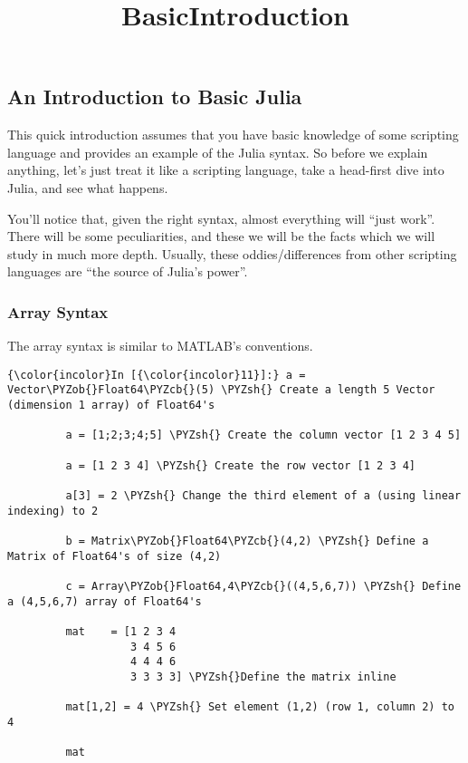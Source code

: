 \documentclass[11pt]{article}
\title{BasicIntroduction}
\def\PYZob{\char`\{}
\def\PYZcb{\char`\}}
\def\PYZsh{\char`\#}
\begin{document}
    
    
    \maketitle
    
    

    
    \subsection{An Introduction to Basic
Julia}\label{an-introduction-to-basic-julia}

This quick introduction assumes that you have basic knowledge of some
scripting language and provides an example of the Julia syntax. So
before we explain anything, let's just treat it like a scripting
language, take a head-first dive into Julia, and see what happens.

You'll notice that, given the right syntax, almost everything will
``just work''. There will be some peculiarities, and these we will be
the facts which we will study in much more depth. Usually, these
oddies/differences from other scripting languages are ``the source of
Julia's power''.

    \subsubsection{Array Syntax}\label{array-syntax}

The array syntax is similar to MATLAB's conventions.

    \begin{Verbatim}[commandchars=\\\{\}]
{\color{incolor}In [{\color{incolor}11}]:} a = Vector\PYZob{}Float64\PYZcb{}(5) \PYZsh{} Create a length 5 Vector (dimension 1 array) of Float64's
         
         a = [1;2;3;4;5] \PYZsh{} Create the column vector [1 2 3 4 5]
         
         a = [1 2 3 4] \PYZsh{} Create the row vector [1 2 3 4]
         
         a[3] = 2 \PYZsh{} Change the third element of a (using linear indexing) to 2
         
         b = Matrix\PYZob{}Float64\PYZcb{}(4,2) \PYZsh{} Define a Matrix of Float64's of size (4,2)
         
         c = Array\PYZob{}Float64,4\PYZcb{}((4,5,6,7)) \PYZsh{} Define a (4,5,6,7) array of Float64's 
         
         mat    = [1 2 3 4
                   3 4 5 6
                   4 4 4 6
                   3 3 3 3] \PYZsh{}Define the matrix inline 
         
         mat[1,2] = 4 \PYZsh{} Set element (1,2) (row 1, column 2) to 4
         
         mat
\end{Verbatim}
\end{document}
